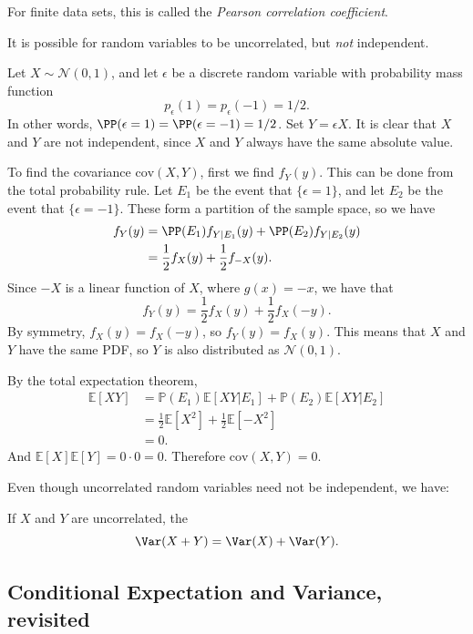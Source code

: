 \documentclass{ximera}
\begin{document}
For finite data sets, this is called the \textit{Pearson correlation coefficient}.
\begin{example}
It is possible for random variables to be uncorrelated, but \textit{not} independent.

Let $X\sim \mathcal{N}(0,1)$, and let $\epsilon$ be a discrete random variable with probability mass function
$$
p_{\epsilon}(1) = p_{\epsilon}(-1) = 1/2.
$$
In other words, $\PP(\epsilon=1) = \PP(\epsilon =-1)=1/2$. Set $Y=\epsilon X$. It is clear that $X$ and $Y$ are not independent, since $X$ and $Y$ always have the same absolute value.

To find the covariance $\mathrm{cov}(X,Y)$, first we find $f_Y(y)$. This can be done from the total probability rule. Let $E_1$ be the event that $\{\epsilon=1\}$, and let $E_2$ be the event that $\{\epsilon=-1\}$. These form a partition of the sample space, so we have
\begin{align*}
f_Y(y) &= \PP(E_1) f_{Y \vert E_1}(y) + \PP(E_2) f_{Y \vert E_2}(y) \\
&= \frac{1}{2} f_X(y) + \frac{1}{2}f_{-X}(y).
\end{align*}
Since $-X$ is a linear function of $X$, where $g(x)=-x$, we have that
$$
f_Y(y) = \frac{1}{2}f_X(y) + \frac{1}{2}f_X(-y).
$$
By symmetry, $f_X(y)=f_X(-y)$, so $f_Y(y)=f_X(y)$. This means that $X$ and $Y$ have the same PDF, so $Y$ is also distributed as $\mathcal{N}(0,1)$. 

By the total expectation theorem,
\begin{equation*}
\begin{aligned} \mathbb{E}[X Y] &=\mathbb{P}\left(E_{1}\right) \mathbb{E}\left[X Y | E_{1}\right]+\mathbb{P}\left(E_{2}\right) \mathbb{E}\left[X Y | E_{2}\right] \\ &=\frac{1}{2} \mathbb{E}\left[X^{2}\right]+\frac{1}{2} \mathbb{E}\left[-X^{2}\right] \\ &=0 .\end{aligned}
\end{equation*}
And $\mathbb{E}[X]\mathbb{E}[Y] = 0\cdot 0 =0$. Therefore $\mathrm{cov}(X,Y)=0$.
\end{example}


Even though uncorrelated random variables need not be independent, we have:
\begin{theorem}
If $X$ and $Y$ are uncorrelated, the
$$
\Var(X+Y) = \Var(X) + \Var(Y).
$$
\end{theorem}

\subsection{Conditional Expectation and Variance, revisited}
\end{document}

